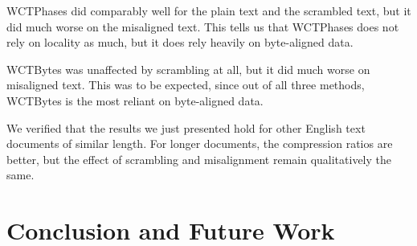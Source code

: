 \documentclass[11pt]{scrartcl}
\begin{document}
WCTPhases did comparably well for the plain text and the scrambled text, but it
did much worse on the misaligned text. This tells us that WCTPhases does not
rely on locality as much, but it does rely heavily on byte-aligned data.

WCTBytes was unaffected by scrambling at all, but it did much worse on
misaligned text. This was to be expected, since out of all three methods,
WCTBytes is the most reliant on byte-aligned data.

We verified that the results we just presented hold for other English text
documents of similar length. For longer documents, the compression ratios are
better, but the effect of scrambling and misalignment remain qualitatively the
same.



\section{Conclusion and Future Work}


\printbibliography
\end{document}
